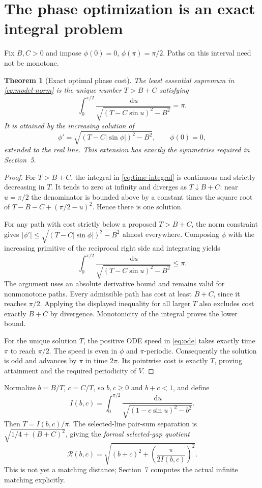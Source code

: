 \documentclass[11pt]{article}
\newtheorem{theorem}{Theorem}[section]
\theoremstyle{remark}
\newcommand{\dd}{\,\mathrm{d}}
\newcommand{\Rformal}{\mathcal R}
\begin{document}
\section{The phase optimization is an exact integral problem}
Fix $B,C>0$ and impose $\phi(0)=0$, $\phi(\pi)=\pi/2$. Paths on this interval need not be monotone.
\begin{theorem}[Exact optimal phase cost]\label{thm:phase}
The least essential supremum in \eqref{eq:model-norm} is the unique number $T>B+C$ satisfying
\begin{equation}\label{eq:time-integral}
 \int_0^{\pi/2}\frac{\dd u}{\sqrt{(T-C\sin u)^2-B^2}}=\pi.
\end{equation}
It is attained by the increasing solution of
\begin{equation}\label{eq:ode}
 \phi'=\sqrt{(T-C|\sin\phi|)^2-B^2},\qquad \phi(0)=0,
\end{equation}
extended to the real line. This extension has exactly the symmetries required in Section~5.
\end{theorem}
\begin{proof}
For $T>B+C$, the integral in \eqref{eq:time-integral} is continuous and strictly decreasing in $T$. It tends to zero at infinity and diverges as $T\downarrow B+C$: near $u=\pi/2$ the denominator is bounded above by a constant times the square root of $T-B-C+(\pi/2-u)^2$. Hence there is one solution.

For any path with cost strictly below a proposed $T>B+C$, the norm constraint gives
$|\phi'|\le\sqrt{(T-C|\sin\phi|)^2-B^2}$ almost everywhere. Composing $\phi$ with the increasing primitive of the reciprocal right side and integrating yields
\[
 \int_0^{\pi/2}\frac{\dd u}{\sqrt{(T-C\sin u)^2-B^2}}\le\pi.
\]
The argument uses an absolute derivative bound and remains valid for nonmonotone paths. Every admissible path has cost at least $B+C$, since it reaches $\pi/2$. Applying the displayed inequality for all larger $T$ also excludes cost exactly $B+C$ by divergence. Monotonicity of the integral proves the lower bound.

For the unique solution $T$, the positive ODE speed in \eqref{eq:ode} takes exactly time $\pi$ to reach $\pi/2$. The speed is even in $\phi$ and $\pi$-periodic. Consequently the solution is odd and advances by $\pi$ in time $2\pi$. Its pointwise cost is exactly $T$, proving attainment and the required periodicity of $V$.
\end{proof}

Normalize $b=B/T$, $c=C/T$, so $b,c\ge0$ and $b+c<1$, and define
\begin{equation}\label{eq:I}
 I(b,c)=\int_0^{\pi/2}\frac{\dd u}{\sqrt{(1-c\sin u)^2-b^2}}.
\end{equation}
Then $T=I(b,c)/\pi$. The selected-line pair-sum separation is
$\sqrt{1/4+(B+C)^2}$, giving the \emph{formal selected-gap quotient}
\begin{equation}\label{eq:formal}
 \Rformal(b,c)=\sqrt{(b+c)^2+\left(\frac{\pi}{2I(b,c)}\right)^2}.
\end{equation}
This is not yet a matching distance; Section~7 computes the actual infinite matching explicitly.
\end{document}
